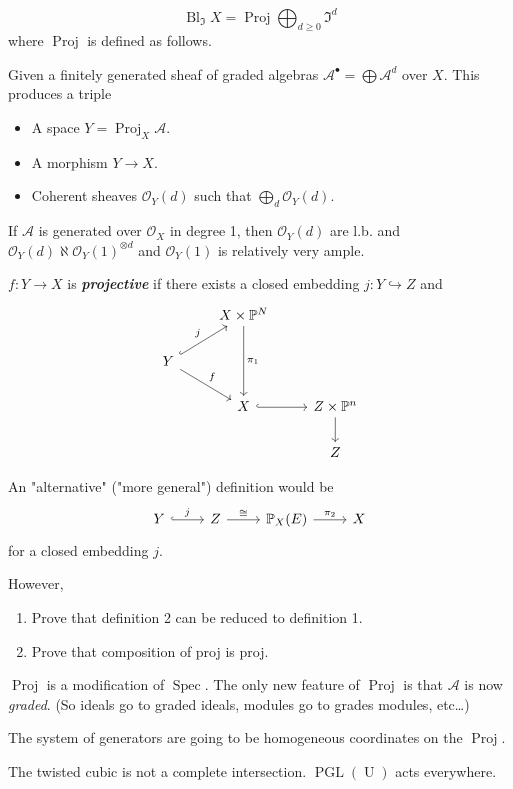 \documentclass{article}
\renewcommand{\P}{\mathbb{P}}
\newcommand{\Ac}{\mathcal{A}}
\newcommand{\Oc}{\mathcal{O}}
\newcommand{\If}{\mathfrak{I}}
\DeclareMathOperator{\Spec}{Spec}
\DeclareMathOperator{\Bl}{Bl}
\DeclareMathOperator{\Proj}{Proj}
\DeclareMathOperator{\U}{U}
\DeclareMathOperator{\PGL}{PGL}
\begin{document}
\begin{defn}
	\[\Bl_{\If}X=\Proj\bigoplus_{d\geq0}\If^d\]
	where $\Proj$ is defined as follows.
\end{defn}
\begin{defn}[1]
	Given a finitely generated sheaf of graded algebras $\Ac^\bullet=\bigoplus\Ac^d$ over $X$. This produces a triple
	\begin{itemize}
		\item A space $Y=\Proj_X\Ac$.
		\item A morphism $Y\to X$.
		\item Coherent sheaves $\Oc_Y(d)$ such that $\bigoplus_d\Oc_Y(d)$.
	\end{itemize}
	If $\Ac$ is generated over $\Oc_X$ in degree 1, then $\Oc_Y(d)$ are l.b. and $\Oc_Y(d)\aleph\Oc_Y(1)^{\otimes d}$ and $\Oc_Y(1)$ is relatively very ample.
	
	$f:Y\to X$ is \textbf{\textit{projective}} if there exists a closed embedding $j:Y\hookrightarrow Z$ and
	\[\begin{tikzcd}
		&X\times\P^N\arrow[dd,"\pi_1"]\\
		Y\arrow[ur,hook,"j"]\arrow[dr,"f"]&\\
		&X\arrow[r,hook]&Z\times \P^n\arrow[d]\\
		&&Z
	\end{tikzcd}\]
\end{defn}
\begin{defn}[2]
	An "alternative" ("more general") definition would be
	\[\begin{tikzcd}
		Y\arrow[r,hook,"j"]&Z\arrow[r,"\cong"]&\P_X(E)\arrow[r,"\pi_2"]&X
	\end{tikzcd}\]
	for a closed embedding $j$.
\end{defn}
However,
\begin{exercise}\leavevmode
	\begin{enumerate}
		\item Prove that definition 2 can be reduced to definition 1.
		\item Prove that composition of proj is proj.
	\end{enumerate}
\end{exercise}
\begin{remark}
	$\Proj$ is a modification of $\Spec$. The only new feature of $\Proj$ is that $\Ac$ is now \textit{graded}. (So ideals go to graded ideals, modules go to grades modules, etc…)
\end{remark}
The system of generators are going to be homogeneous coordinates on the $\Proj$.
\begin{example}
	The twisted cubic is not a complete intersection. $\PGL(\U)$ acts everywhere.
\end{example}
\end{document}

